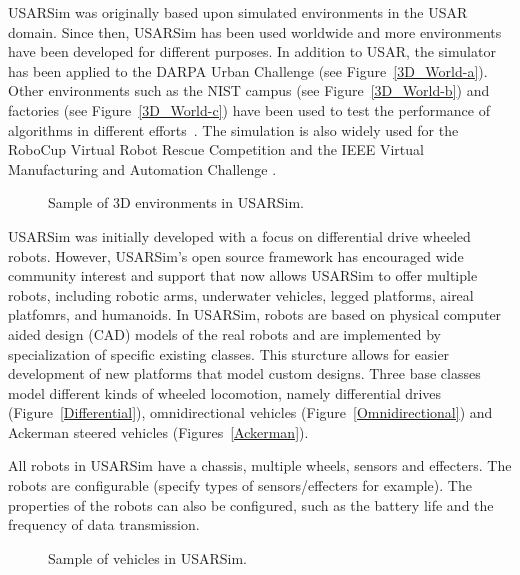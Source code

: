 USARSim was originally based upon simulated environments in the USAR domain.
Since then, USARSim has been used worldwide and more environments have been developed for different purposes. In addition to USAR, the simulator has been applied to the DARPA Urban Challenge (see Figure~\ref{3D_World-a}). Other environments such as the NIST campus (see Figure~\ref{3D_World-b}) and factories (see Figure~\ref{3D_World-c}) have been used to test the performance of algorithms in different efforts~\cite{WANG.HFES.2005,BALAGUER.IROS.2008,KOOTBALLY.ITEA.2010}. The simulation is also widely used for the RoboCup Virtual Robot Rescue Competition \cite{RoboCupWeb} and the IEEE Virtual Manufacturing and Automation Challenge \cite{VMACWeb}.

\begin{figure}[t!]
\centering
{}\qquad
{}\qquad
{}%
\caption{Sample of 3D environments in USARSim.} \label{3D_World}
\end{figure}

USARSim was initially developed with a focus on differential drive wheeled robots. However, USARSim's open source framework has encouraged wide community interest and support that now allows USARSim to offer multiple robots, including robotic arms, underwater vehicles, legged
platforms, aireal platfomrs, and humanoids. In USARSim, robots are based on physical computer aided design (CAD) models of the real
robots and are implemented by specialization of specific existing classes. This sturcture allows for
easier development of new platforms that model custom designs. Three
base classes model different kinds of wheeled locomotion, namely
differential drives (Figure~\ref{Differential}), omnidirectional
vehicles (Figure~\ref{Omnidirectional}) and Ackerman steered
vehicles (Figures~\ref{Ackerman}).



All robots in USARSim have a chassis, multiple wheels, sensors and
effecters. The robots are configurable (specify types of
sensors/effecters for example). The properties of the robots can
also be configured, such as the battery life and the frequency of
data transmission.

\begin{figure}[t!]
\centering
{}\qquad
{}\qquad
{}
\caption{Sample of vehicles in USARSim.}
\end{figure}



